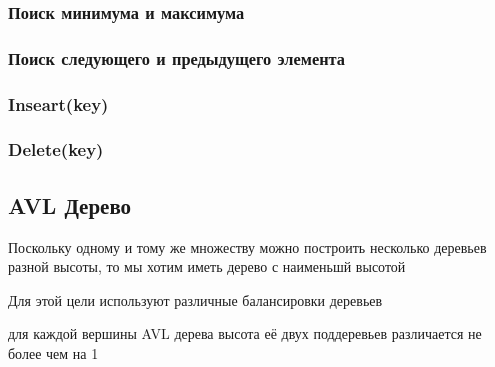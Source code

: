 \subsubsection{Поиск минимума и максимума}
\subsubsection{Поиск следующего и предыдущего элемента}
\subsubsection{Inseart(key)}
\subsubsection{Delete(key)}

\newpage

\subsection{AVL Дерево}
Поскольку одному и тому же множеству можно построить несколько деревьев разной высоты, то мы хотим иметь дерево с наименьшй высотой\par
Для этой цели используют различные балансировки деревьев\par


\begin{definition}
	для каждой вершины AVL дерева высота её двух поддеревьев различается не более чем на 1
\end{definition}

\begin{theorem}
	
\end{theorem}




